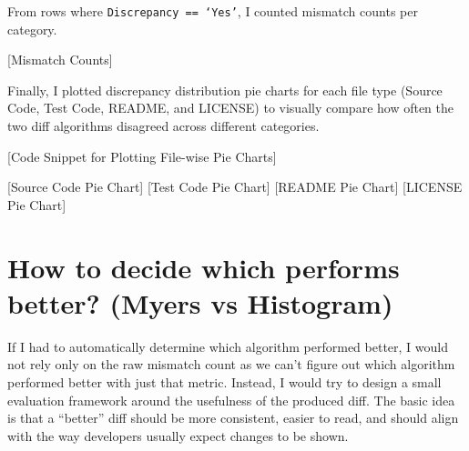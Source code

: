 \documentclass[10pt,a4paper]{report}
\begin{document}
From rows where \texttt{Discrepancy == `Yes'}, I counted mismatch counts per category.

[Mismatch Counts]



Finally, I plotted discrepancy distribution pie charts for each file type (Source Code, Test Code, README, and LICENSE) to visually compare how often the two diff algorithms disagreed across different categories.

[Code Snippet for Plotting File-wise Pie Charts]

[Source Code Pie Chart]
[Test Code Pie Chart]
[README Pie Chart]
[LICENSE Pie Chart]

\section{How to decide which performs better? (Myers vs Histogram)}

If I had to automatically determine which algorithm performed better, I would not rely only on the raw mismatch count as we can't figure out which algorithm performed better with just that metric. Instead, I would try to design a small evaluation framework around the usefulness of the produced diff. The basic idea is that a ``better'' diff should be more consistent, easier to read, and should align with the way developers usually expect changes to be shown.
\end{document}
